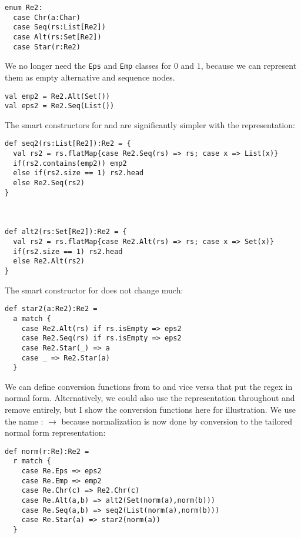 \begin{lstlisting}
enum Re2:
  case Chr(a:Char)
  case Seq(rs:List[Re2])
  case Alt(rs:Set[Re2])
  case Star(r:Re2)
\end{lstlisting}

We no longer need the \lstinline|Eps| and \lstinline|Emp| classes for $0$ and $1$, because we can represent them as empty alternative and sequence nodes.

\begin{lstlisting}
val emp2 = Re2.Alt(Set())
val eps2 = Re2.Seq(List())
\end{lstlisting}

The smart constructors for  and  are significantly simpler with the  representation:

\begin{lstlisting}
def seq2(rs:List[Re2]):Re2 = {
  val rs2 = rs.flatMap{case Re2.Seq(rs) => rs; case x => List(x)}
  if(rs2.contains(emp2)) emp2
  else if(rs2.size == 1) rs2.head
  else Re2.Seq(rs2)
}



def alt2(rs:Set[Re2]):Re2 = {
  val rs2 = rs.flatMap{case Re2.Alt(rs) => rs; case x => Set(x)}
  if(rs2.size == 1) rs2.head
  else Re2.Alt(rs2)
}
\end{lstlisting}

The smart constructor for  does not change much:

\begin{lstlisting}
def star2(a:Re2):Re2 =
  a match {
    case Re2.Alt(rs) if rs.isEmpty => eps2
    case Re2.Seq(rs) if rs.isEmpty => eps2
    case Re2.Star(_) => a
    case _ => Re2.Star(a)
  }
\end{lstlisting}

We can define conversion functions from  to  and vice versa that put the regex in normal form.
Alternatively, we could also use the  representation throughout and remove  entirely, but I show the conversion functions here for illustration.
We use the name  :  $\to$  because normalization is now done by conversion to the tailored normal form representation:

\begin{lstlisting}
def norm(r:Re):Re2 =
  r match {
    case Re.Eps => eps2
    case Re.Emp => emp2
    case Re.Chr(c) => Re2.Chr(c)
    case Re.Alt(a,b) => alt2(Set(norm(a),norm(b)))
    case Re.Seq(a,b) => seq2(List(norm(a),norm(b)))
    case Re.Star(a) => star2(norm(a))
  }
\end{lstlisting}

